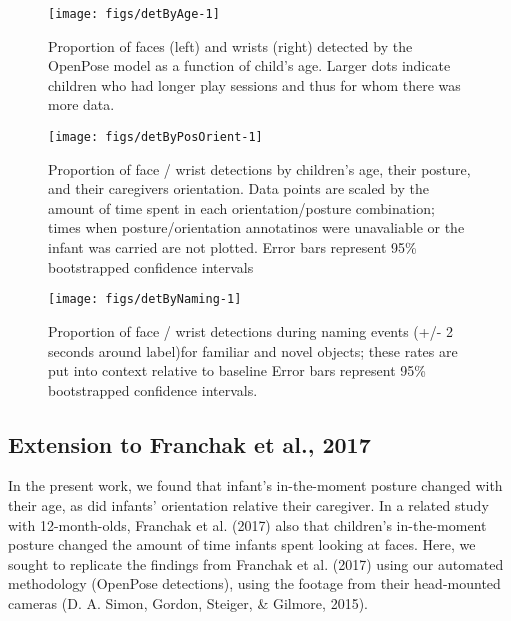 \documentclass[english,man]{apa6}
\begin{document}
\begin{figure}[H]
\texttt{[image: figs/detByAge-1]} \caption{Proportion of faces (left) and wrists (right) detected by the OpenPose model as a function of child's age. Larger dots indicate children who had longer play sessions and thus for whom there was more data.}\label{fig:detByAge}
\end{figure}

\begin{figure}[H]

{\centering \texttt{[image: figs/detByPosOrient-1]} 

}

\caption{Proportion of face / wrist detections by children's age, their posture, and their caregivers orientation. Data points are scaled by the amount of time spent in each orientation/posture combination; times when posture/orientation annotatinos were unavaliable or the infant was carried are not plotted. Error bars represent 95\% bootstrapped confidence intervals}\label{fig:detByPosOrient}
\end{figure}

\begin{figure}[H]

{\centering \texttt{[image: figs/detByNaming-1]} 

}

\caption{Proportion of face / wrist detections during naming events (+/- 2 seconds around label)for familiar and novel objects; these rates are put into context relative to baseline Error bars represent 95\% bootstrapped confidence intervals.}\label{fig:detByNaming}
\end{figure}

\subsection{Extension to Franchak et al.,
2017}\label{extension-to-franchak-et-al.-2017}

In the present work, we found that infant's in-the-moment posture
changed with their age, as did infants' orientation relative their
caregiver. In a related study with 12-month-olds, Franchak et al. (2017)
also that children's in-the-moment posture changed the amount of time
infants spent looking at faces. Here, we sought to replicate the
findings from Franchak et al. (2017) using our automated methodology
(OpenPose detections), using the footage from their head-mounted cameras
(D. A. Simon, Gordon, Steiger, \& Gilmore, 2015).
\end{document}

